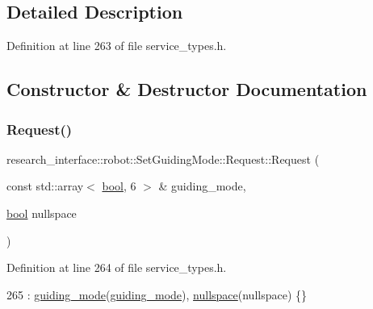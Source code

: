 \subsection{Detailed Description}


Definition at line 263 of file service\+\_\+types.\+h.



\subsection{Constructor \& Destructor Documentation}
\mbox{\label{structresearch__interface_1_1robot_1_1SetGuidingMode_1_1Request_a4d893b8ae2662d0abe9f77a89244907d}} 
\subsubsection{\texorpdfstring{Request()}{Request()}}
{\footnotesize\ttfamily research\+\_\+interface\+::robot\+::\+Set\+Guiding\+Mode\+::\+Request\+::\+Request (\begin{DoxyParamCaption}\item[{const std\+::array$<$ \hyperlink{classbool}{bool}, 6 $>$ \&}]{guiding\+\_\+mode,  }\item[{\hyperlink{classbool}{bool}}]{nullspace }\end{DoxyParamCaption})\hspace{0.3cm}{\ttfamily [inline]}}



Definition at line 264 of file service\+\_\+types.\+h.


\begin{DoxyCode}
265         : \hyperlink{structresearch__interface_1_1robot_1_1SetGuidingMode_1_1Request_a5f52d21bbbd4fbbf9e8664cd65eda67e}{guiding\_mode}(\hyperlink{structresearch__interface_1_1robot_1_1SetGuidingMode_1_1Request_a5f52d21bbbd4fbbf9e8664cd65eda67e}{guiding\_mode}), \hyperlink{structresearch__interface_1_1robot_1_1SetGuidingMode_1_1Request_a3d4319706be3b155addde664de9590c6}{nullspace}(nullspace) \{\}
\end{DoxyCode}


